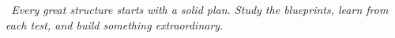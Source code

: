 {\vspace{2mm}

\begin{tcolorbox}[
    enhanced,
    colback=funGreen!4,
    colframe=funGreen!25,
    arc=6pt, boxrule=0.8pt,
    left=5mm, right=5mm, top=3mm, bottom=3mm,
]
    \begin{minipage}[c]{0.07\linewidth}
        \centering \iconOwl[1cm]
    \end{minipage}%
    \hfill
    \begin{minipage}[c]{0.90\linewidth}
        \small\itshape\color{funBlueDark}
        \faQuoteLeft~Every great structure starts with a solid plan.
        Study the blueprints, learn from each test,
        and build something extraordinary.~\faQuoteRight
    \end{minipage}
\end{tcolorbox}

}

\newpage
